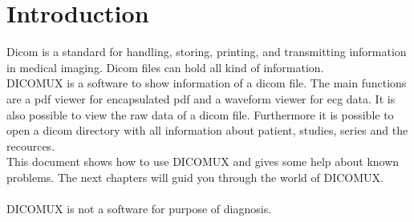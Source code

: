 %
%
\chapter{Introduction}

Dicom is a standard for handling, storing, printing, and transmitting
information in medical imaging. Dicom files can hold all kind of information. \\
DICOMUX is a software to show information of a dicom file. The main functions
are a pdf viewer for encapsulated pdf and a waveform viewer for ecg data. 	
It is also possible to view the raw data of a dicom file. Furthermore it is
possible to open a dicom directory with all information about patient, studies,
series and the recources. \\
This document shows how to use DICOMUX and gives some help about known problems.
The next chapters will guid you through the world of DICOMUX. \\\\
DICOMUX is not a software for purpose of diagnosis.
%
%
